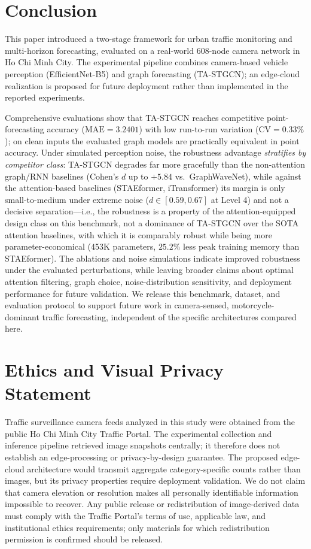 \documentclass[preprint,12pt]{elsarticle}
\begin{document}
\section{Conclusion}
\label{sec:conclusion}

This paper introduced a two-stage framework for urban traffic monitoring and multi-horizon forecasting, evaluated on a real-world 608-node camera network in Ho Chi Minh City. The experimental pipeline combines camera-based vehicle perception (EfficientNet-B5) and graph forecasting (TA-STGCN); an edge-cloud realization is proposed for future deployment rather than implemented in the reported experiments.

Comprehensive evaluations show that TA-STGCN reaches competitive point-forecasting accuracy ($\text{MAE} = \mathbf{3.2401}$) with low run-to-run variation ($\text{CV}=0.33\%$); on clean inputs the evaluated graph models are practically equivalent in point accuracy. Under simulated perception noise, the robustness advantage \emph{stratifies by competitor class}: TA-STGCN degrades far more gracefully than the non-attention graph/RNN baselines (Cohen's $d$ up to $+5.84$ vs.\ GraphWaveNet), while against the attention-based baselines (STAEformer, iTransformer) its margin is only small-to-medium under extreme noise ($d \in [0.59, 0.67]$ at Level 4) and not a decisive separation---i.e., the robustness is a property of the attention-equipped design class on this benchmark, not a dominance of TA-STGCN over the SOTA attention baselines, with which it is comparably robust while being more parameter-economical (453K parameters, $25.2\%$ less peak training memory than STAEformer). The ablations and noise simulations indicate improved robustness under the evaluated perturbations, while leaving broader claims about optimal attention filtering, graph choice, noise-distribution sensitivity, and deployment performance for future validation. We release this benchmark, dataset, and evaluation protocol to support future work in camera-sensed, motorcycle-dominant traffic forecasting, independent of the specific architectures compared here.

\section*{Ethics and Visual Privacy Statement}
Traffic surveillance camera feeds analyzed in this study were obtained from the public Ho Chi Minh City Traffic Portal. The experimental collection and inference pipeline retrieved image snapshots centrally; it therefore does not establish an edge-processing or privacy-by-design guarantee. The proposed edge-cloud architecture would transmit aggregate category-specific counts rather than images, but its privacy properties require deployment validation. We do not claim that camera elevation or resolution makes all personally identifiable information impossible to recover. Any public release or redistribution of image-derived data must comply with the Traffic Portal's terms of use, applicable law, and institutional ethics requirements; only materials for which redistribution permission is confirmed should be released.
\end{document}
